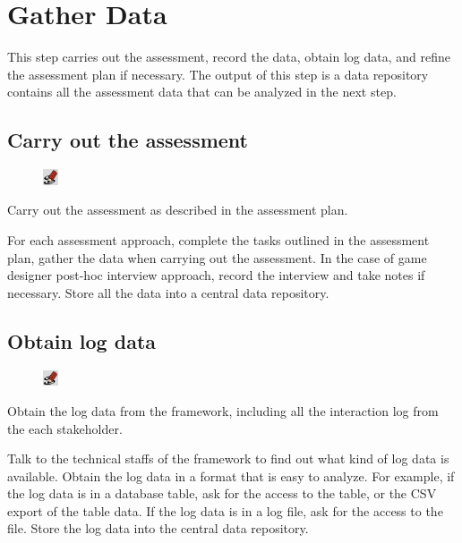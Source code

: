 \documentclass[11pt,oneside]{book}
\begin{document}
\chapter{Gather Data}
This step carries out the assessment, record the data, obtain log data, and refine the assessment plan if necessary. 
The output of this step is a data repository contains all the assessment data that can be analyzed in the next step.

\section{Carry out the assessment}
\begin{shadebox}
\begin{figure}
\vspace{-15pt}\hspace{-10pt}
    \includegraphics[width=0.04\textwidth]{note-icon}
\end{figure}
Carry out the assessment as described in the assessment plan.
\end{shadebox}

For each assessment approach, complete the tasks outlined in the assessment plan, gather the data when carrying out the 
assessment. In the case of game designer post-hoc interview approach, record the interview and take notes if necessary. 
Store all the data into a central data repository. 

\section{Obtain log data}
\begin{shadebox}
\begin{figure}
\vspace{-15pt}\hspace{-10pt}
    \includegraphics[width=0.04\textwidth]{note-icon}
\end{figure}
Obtain the log data from the framework, including all the interaction log from the each stakeholder.
\end{shadebox}

Talk to the technical staffs of the framework to find out what kind of log data is available. Obtain the log data in a format that 
is easy to analyze. For example, if the log data is in a database table, ask for the access to the table, or the CSV export of 
the table data. If the log data is in a log file, ask for the access to the file. Store the log data into the central data repository.
\end{document}
